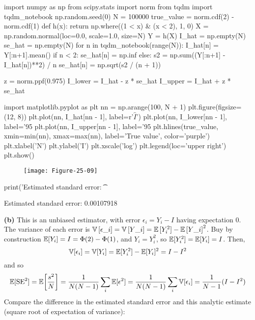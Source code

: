 \begin{python}
import numpy as np
from scipy.stats import norm
from tqdm import tqdm_notebook
np.random.seed(0)
N = 100000
true_value = norm.cdf(2) - norm.cdf(1)
def h(x):
    return np.where((1 < x) & (x < 2), 1, 0)
X = np.random.normal(loc=0.0, scale=1.0, size=N)
Y = h(X)
I_hat = np.empty(N)
se_hat = np.empty(N)
for n in tqdm_notebook(range(N)):
    I_hat[n] = Y[:n+1].mean()
    if n < 2:
        se_hat[n] = np.inf
    else:
        s2 = np.sum((Y[:n+1] - I_hat[n])**2) / n
        se_hat[n] = np.sqrt(s2 / (n + 1))
        
z = norm.ppf(0.975)
I_lower = I_hat - z * se_hat
I_upper = I_hat + z * se_hat
\end{python}

\begin{python}
import matplotlib.pyplot as plt
nn = np.arange(100, N + 1)
plt.figure(figsize=(12, 8))
plt.plot(nn, I_hat[nn - 1], label=r'$\hat{I}$')
plt.plot(nn, I_lower[nn - 1], label='95%
plt.plot(nn, I_upper[nn - 1], label='95%
plt.hlines(true_value, xmin=min(nn), xmax=max(nn), label='True value', color='purple')
plt.xlabel('N')
plt.ylabel('I')
plt.xscale('log')
plt.legend(loc='upper right')
plt.show()
\end{python}

\begin{figure}[H]
\centering
\texttt{[image: Figure-25-09]}
\end{figure}


\begin{python}
print('Estimated standard error: \t %
\end{python}
\begin{console}
Estimated standard error:        0.00107918
\end{console}
\textbf{(b)} This is an unbiased estimator, with error
\(\epsilon_{i} = Y_{i} - I\) having expectation 0. The variance of each
error is $ \operatorname{\mathbb{V}}{[}\epsilon\_{i}{]} = \operatorname{\mathbb{V}}{[}Y\_{i}{]} =
\operatorname{\mathbb{E}}{[}Y_{i}^{2}{]} - \operatorname{\mathbb{E}}{[}Y\_{i}{]}^{2}$. Buy by
construction \(\operatorname{\mathbb{E}}[Y_{i}] = I = \Phi(2) - \Phi(1)\), and
\(Y_{i} = Y_{i}^{2}\), so \(\operatorname{\mathbb{E}}[Y_{i}^{2}] = \operatorname{\mathbb{E}}[Y_{i}] = I\). Then,
\[
\operatorname{\mathbb{V}}[\epsilon_{i}] = \operatorname{\mathbb{V}}[Y_{i}] = \operatorname{\mathbb{E}}[Y_{i}^{2}] - \operatorname{\mathbb{E}}[Y_{i}]^{2} = I - I^{2}
\]
and so
\[
\EXP[\SE ^{2}] = \EXP\left[\frac{s^{2}}{N}\right] = \frac{1}{N(N - 1)} \sum_{i} \EXP[\epsilon^{2}] = \frac{1}{N(N - 1)} \sum_{i} \VAR[\epsilon_{i}] = \frac{1}{N - 1} (I - I^{2})
\]
Compare the difference in the estimated standard error and this
analytic estimate (square root of expectation of variance):


